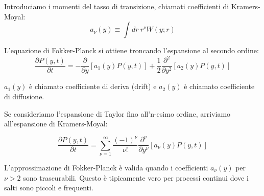 Introduciamo i momenti del tasso di transizione, chiamati coefficienti di Kramers-Moyal:
\begin{equation}
a_{\nu}(y) \equiv \int dr~r^{\nu} W(y; r)
\end{equation}


L'equazione di Fokker-Planck si ottiene troncando l'espansione al secondo ordine:
\begin{equation}
\frac{\partial P(y,t)}{\partial t} = -\frac{\partial}{\partial y} [a_1(y)P(y,t)] + \frac{1}{2}\frac{\partial^2}{\partial y^2} [a_2(y)P(y,t)]
\end{equation}


$a_1(y)$ è chiamato coefficiente di deriva (drift) e $a_2(y)$ è chiamato coefficiente di diffusione.

Se consideriamo l'espansione di Taylor fino all'n-esimo ordine, arriviamo all'espansione di Kramers-Moyal:


\begin{equation}
\frac{\partial P(y,t)}{\partial t} = \sum_{\nu=1}^{\infty} \frac{(-1)^{\nu}}{\nu!} \frac{\partial^{\nu}}{\partial y^{\nu}} [a_{\nu}(y)P(y,t)]
\end{equation}


L'approssimazione di Fokker-Planck è valida quando i coefficienti $a_{\nu}(y)$ per $\nu > 2$ sono trascurabili. Questo è tipicamente vero per processi continui dove i salti sono piccoli e frequenti.